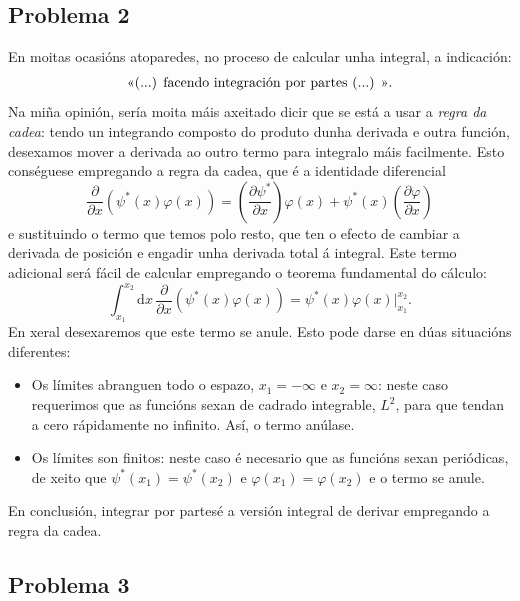 \documentclass[a4paper,12pt]{article}
\begin{document}
\subsection*{Problema 2}

En moitas ocasións atoparedes, no proceso de calcular unha integral, a indicación:
\begin{align*}
	\text{\guillemotleft (...) facendo integración por partes (...) \guillemotright}.
\end{align*}
Na miña opinión, sería moita máis axeitado dicir que se está a usar a \textit{regra da cadea}: tendo un integrando composto do produto dunha derivada e outra función, desexamos mover a derivada ao outro termo para integralo máis facilmente. Esto conséguese empregando a regra da cadea, que é a identidade diferencial
\begin{equation}
	\frac{\partial}{\partial x} (\psi^*(x) \varphi(x)) = \left( \frac{\partial \psi^*}{\partial x}\right) \varphi(x) + \psi^*(x) \left( \frac{\partial \varphi}{\partial x}\right)
\end{equation}
\noindent
e sustituindo o termo que temos polo resto, que ten o efecto de cambiar a derivada de posición e engadir unha derivada total á integral. Este termo adicional será fácil de calcular empregando o teorema fundamental do cálculo:
\begin{equation}
	\int_{x_1}^{x_2} \mathrm{d}x \, \frac{\partial}{\partial x} (\psi^*(x) \varphi(x)) = \psi^*(x) \varphi(x) \Big |_{x_1}^{x_2}.
\end{equation}
\noindent
En xeral desexaremos que este termo se anule. Esto pode darse en dúas situacións diferentes:
\begin{itemize}
	\item[i)] Os límites abranguen todo o espazo, $x_1 = -\infty$ e $x_2 = \infty$: neste caso requerimos que as funcións sexan de cadrado integrable, $L^2$, para que tendan a cero rápidamente no infinito. Así, o termo anúlase.

	\item[ii)] Os límites son finitos: neste caso é necesario que as funcións sexan periódicas, de xeito que $\psi^*(x_1) = \psi^*(x_2)$ e $\varphi(x_1) = \varphi(x_2)$ e o termo se anule.
\end{itemize}

En conclusión, \guillemotleft integrar por partes\guillemotright é a versión integral de \guillemotleft derivar empregando a regra da cadea\guillemotright.

\subsection*{Problema 3}
\end{document}
